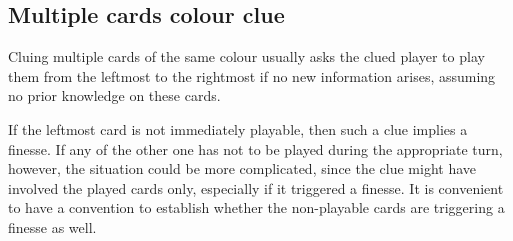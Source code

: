 \documentclass[a4paper]{article}
\theoremstyle{plain}
\theoremstyle{definition}
\newtheorem{convention}[theorem]{Convention}
\begin{document}
\subsection{Multiple cards colour clue}

Cluing multiple cards of the same colour usually asks the clued player to play them from the leftmost to the rightmost if no new information arises, assuming no prior knowledge on these cards.

If the leftmost card is not immediately playable, then such a clue implies a finesse. If any of the other one has not to be played during the appropriate turn, however, the situation could be more complicated, since the clue might have involved the played cards only, especially if it triggered a finesse. It is convenient to have a convention to establish whether the non-playable cards are triggering a finesse as well.

\end{document}
